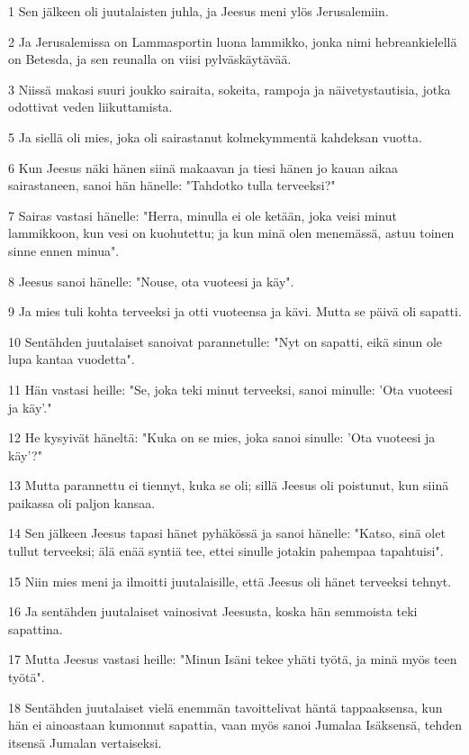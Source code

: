 \par 1 Sen jälkeen oli juutalaisten juhla, ja Jeesus meni ylös Jerusalemiin.
\par 2 Ja Jerusalemissa on Lammasportin luona lammikko, jonka nimi hebreankielellä on Betesda, ja sen reunalla on viisi pylväskäytävää.
\par 3 Niissä makasi suuri joukko sairaita, sokeita, rampoja ja näivetystautisia, jotka odottivat veden liikuttamista.
\par 5 Ja siellä oli mies, joka oli sairastanut kolmekymmentä kahdeksan vuotta.
\par 6 Kun Jeesus näki hänen siinä makaavan ja tiesi hänen jo kauan aikaa sairastaneen, sanoi hän hänelle: "Tahdotko tulla terveeksi?"
\par 7 Sairas vastasi hänelle: "Herra, minulla ei ole ketään, joka veisi minut lammikkoon, kun vesi on kuohutettu; ja kun minä olen menemässä, astuu toinen sinne ennen minua".
\par 8 Jeesus sanoi hänelle: "Nouse, ota vuoteesi ja käy".
\par 9 Ja mies tuli kohta terveeksi ja otti vuoteensa ja kävi. Mutta se päivä oli sapatti.
\par 10 Sentähden juutalaiset sanoivat parannetulle: "Nyt on sapatti, eikä sinun ole lupa kantaa vuodetta".
\par 11 Hän vastasi heille: "Se, joka teki minut terveeksi, sanoi minulle: 'Ota vuoteesi ja käy'."
\par 12 He kysyivät häneltä: "Kuka on se mies, joka sanoi sinulle: 'Ota vuoteesi ja käy'?"
\par 13 Mutta parannettu ei tiennyt, kuka se oli; sillä Jeesus oli poistunut, kun siinä paikassa oli paljon kansaa.
\par 14 Sen jälkeen Jeesus tapasi hänet pyhäkössä ja sanoi hänelle: "Katso, sinä olet tullut terveeksi; älä enää syntiä tee, ettei sinulle jotakin pahempaa tapahtuisi".
\par 15 Niin mies meni ja ilmoitti juutalaisille, että Jeesus oli hänet terveeksi tehnyt.
\par 16 Ja sentähden juutalaiset vainosivat Jeesusta, koska hän semmoista teki sapattina.
\par 17 Mutta Jeesus vastasi heille: "Minun Isäni tekee yhäti työtä, ja minä myös teen työtä".
\par 18 Sentähden juutalaiset vielä enemmän tavoittelivat häntä tappaaksensa, kun hän ei ainoastaan kumonnut sapattia, vaan myös sanoi Jumalaa Isäksensä, tehden itsensä Jumalan vertaiseksi.
